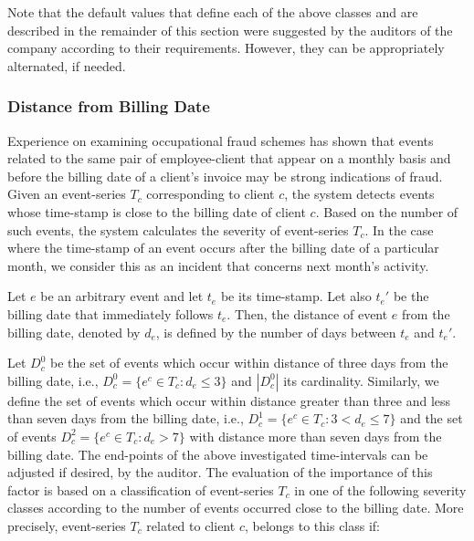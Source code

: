 \documentclass[conference]{IEEEtran}
\begin{document}
Note that the default values that define each of the above classes
and are described in the remainder of this section were suggested by
the auditors of the company according to their requirements.
However, they can be appropriately alternated, if needed.


\subsubsection{Distance from Billing Date}

Experience on examining occupational fraud schemes has shown that
events related to the same pair of employee-client that appear on a
monthly basis and before the billing date of a client's invoice may
be strong indications of fraud. Given an event-series $T_c$
corresponding to client $c$, the system detects events whose
time-stamp is close to the billing date of client $c$. Based on the
number of such events, the system calculates the severity of
event-series $T_c$. In the case where the time-stamp of an event
occurs after the billing date of a particular month, we consider
this as an incident that concerns next month's activity.

Let $e$ be an arbitrary event and let $t_e$ be its time-stamp. Let
also $t_e'$ be the billing date that immediately follows $t_e$.
Then, the distance of event $e$ from the billing date, denoted by
$d_e$, is defined by the number of days between $t_e$ and $t_e'$.

Let $D_c^0$ be the set of events which occur within distance of
three days from the billing date, i.e., $D_c^0 = \{e^c \in T_c : d_e
\leq 3 \}$ and $|D_c^0|$ its cardinality. Similarly, we define the
set of events which occur within distance greater than three and
less than seven days from the billing date, i.e., $D_c^1 = \{e^c \in
T_c: 3 < d_e \leq 7 \}$ and the set of events $D_c^2 = \{e^c \in T_c
: d_e > 7 \}$ with distance more than seven days from the billing
date. The end-points of the above investigated time-intervals can be
adjusted if desired, by the auditor. The evaluation of the
importance of this factor is based on a classification of
event-series $T_c$ in one of the following severity classes
according to the number of events occurred close to the billing
date. More precisely, event-series $T_c$ related to client $c$,
belongs to this class if:
\end{document}
